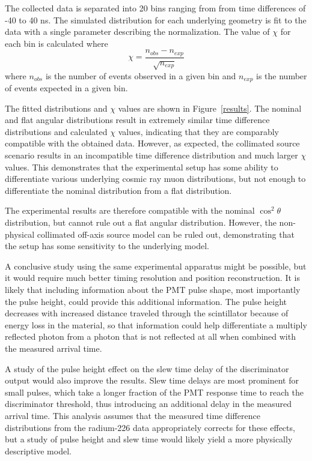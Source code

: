 The collected data is separated into 20 bins ranging from from time differences of -40 to 40 ns. The simulated distribution for each underlying geometry is fit to the data with a single parameter describing the normalization. The value of $\chi$ for each bin is calculated where
\begin{equation}
\chi = \frac{n_{obs}-n_{exp}}{\sqrt{n_{exp}}}
\end{equation}
where $n_{obs}$ is the number of events observed in a given bin and $n_{exp}$ is the number of events expected in a given bin. 

The fitted distributions and $\chi$ values are shown in Figure~\ref{results}. The nominal and flat angular distributions result in extremely similar time difference distributions and calculated $\chi$ values, indicating that they are comparably compatible with the obtained data. However, as expected, the collimated source scenario results in an incompatible time difference distribution and much larger $\chi$ values. This demonstrates that the experimental setup has some ability to differentiate various underlying cosmic ray muon distributions, but not enough to differentiate the nominal distribution from a flat distribution. 

The experimental results are therefore compatible with the nominal $\cos^{2}{\theta}$ distribution, but cannot rule out a flat angular distribution. However, the non-physical collimated off-axis source model can be ruled out, demonstrating that the setup has some sensitivity to the underlying model.

A conclusive study using the same experimental apparatus might be possible, but it would require much better timing resolution and position reconstruction. It is likely that including information about the PMT pulse shape, most importantly the pulse height, could provide this additional information. The pulse height decreases with increased distance traveled through the scintillator because of energy loss in the material, so that information could help differentiate a multiply reflected photon from a photon that is not reflected at all when combined with the measured arrival time. 

A study of the pulse height effect on the slew time delay of the discriminator output would also improve the results. Slew time delays are most prominent for small pulses, which take a longer fraction of the PMT response time to reach the discriminator threshold, thus introducing an additional delay in the measured arrival time. This analysis assumes that the measured time difference distributions from the radium-226 data appropriately corrects for these effects, but a study of pulse height and slew time would likely yield a more physically descriptive model. 

